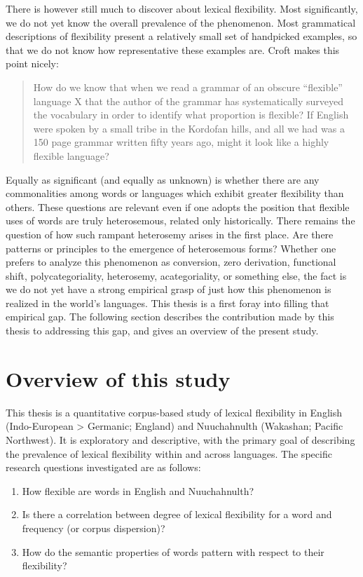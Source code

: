 There is however still much to discover about lexical flexibility. Most significantly, we do not yet know the overall prevalence of the phenomenon. Most grammatical descriptions of flexibility present a relatively small set of handpicked examples, so that we do not know how representative these examples are. Croft  makes this point nicely:

\blockquote[]{How do we know that when we read a grammar of an obscure \enquote{flexible} language X that the author of the grammar has systematically surveyed the vocabulary in order to identify what proportion is flexible? If English were spoken by a small tribe in the Kordofan hills, and all we had was a 150 page grammar written fifty years ago, might it look like a highly flexible language?}

\noindent Equally as significant (and equally as unknown) is whether there are any commonalities among words or languages which exhibit greater flexibility than others. These questions are relevant even if one adopts the position that flexible uses of words are truly heterosemous, related only historically. There remains the question of how such rampant heterosemy arises in the first place. Are there patterns or principles to the emergence of heterosemous forms? Whether one prefers to analyze this phenomenon as conversion, zero derivation, functional shift, polycategoriality, heterosemy, acategoriality, or something else, the fact is we do not yet have a strong empirical grasp of just how this phenomenon is realized in the world's languages. This thesis is a first foray into filling that empirical gap. The following section describes the contribution made by this thesis to addressing this gap, and gives an overview of the present study.

\section{Overview of this study}
\label{sec:1.3}

This thesis is a quantitative corpus-based study of lexical flexibility in English (Indo-European > Germanic; England) and Nuuchahnulth (Wakashan; Pacific Northwest). It is exploratory and descriptive, with the primary goal of describing the prevalence of lexical flexibility within and across languages. The specific research questions investigated are as follows:

\begin{enumerate}[
  label      = {\textbf{R\arabic*:}},
  leftmargin = *,
  ref        = {R\arabic*}
]
  \item\label{R1} How flexible are words in English and Nuuchahnulth?
  \item\label{R2} Is there a correlation between degree of lexical flexibility for a word and frequency (or corpus dispersion)?
  \item\label{R3} How do the semantic properties of words pattern with respect to their flexibility?
\end{enumerate}

